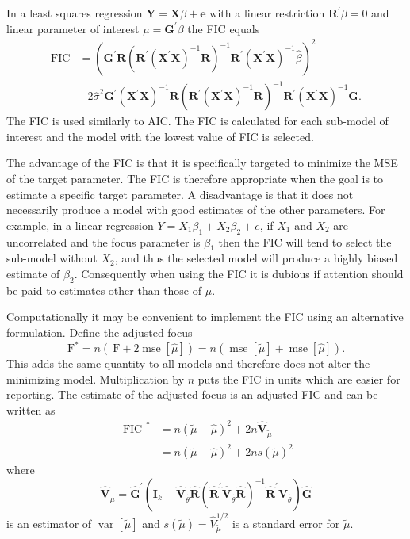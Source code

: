 \documentclass[10pt]{article}
\begin{document}
In a least squares regression $\boldsymbol{Y}=\boldsymbol{X} \beta+\boldsymbol{e}$ with a linear restriction $\boldsymbol{R}^{\prime} \beta=0$ and linear parameter of interest $\mu=\boldsymbol{G}^{\prime} \beta$ the FIC equals
$$
\begin{aligned}
\mathrm{FIC} &=\left(\boldsymbol{G}^{\prime} \boldsymbol{R}\left(\boldsymbol{R}^{\prime}\left(\boldsymbol{X}^{\prime} \boldsymbol{X}\right)^{-1} \boldsymbol{R}\right)^{-1} \boldsymbol{R}^{\prime}\left(\boldsymbol{X}^{\prime} \boldsymbol{X}\right)^{-1} \widehat{\beta}\right)^{2} \\
&-2 \widehat{\sigma}^{2} \boldsymbol{G}^{\prime}\left(\boldsymbol{X}^{\prime} \boldsymbol{X}\right)^{-1} \boldsymbol{R}\left(\boldsymbol{R}^{\prime}\left(\boldsymbol{X}^{\prime} \boldsymbol{X}\right)^{-1} \boldsymbol{R}\right)^{-1} \boldsymbol{R}^{\prime}\left(\boldsymbol{X}^{\prime} \boldsymbol{X}\right)^{-1} \boldsymbol{G} .
\end{aligned}
$$
The FIC is used similarly to AIC. The FIC is calculated for each sub-model of interest and the model with the lowest value of FIC is selected.

The advantage of the FIC is that it is specifically targeted to minimize the MSE of the target parameter. The FIC is therefore appropriate when the goal is to estimate a specific target parameter. A disadvantage is that it does not necessarily produce a model with good estimates of the other parameters. For example, in a linear regression $Y=X_{1} \beta_{1}+X_{2} \beta_{2}+e$, if $X_{1}$ and $X_{2}$ are uncorrelated and the focus parameter is $\beta_{1}$ then the FIC will tend to select the sub-model without $X_{2}$, and thus the selected model will produce a highly biased estimate of $\beta_{2}$. Consequently when using the FIC it is dubious if attention should be paid to estimates other than those of $\mu$.

Computationally it may be convenient to implement the FIC using an alternative formulation. Define the adjusted focus
$$
\mathrm{F}^{*}=n(\mathrm{~F}+2 \operatorname{mse}[\widehat{\mu}])=n(\operatorname{mse}[\widetilde{\mu}]+\operatorname{mse}[\widehat{\mu}]) .
$$
This adds the same quantity to all models and therefore does not alter the minimizing model. Multiplication by $n$ puts the FIC in units which are easier for reporting. The estimate of the adjusted focus is an adjusted FIC and can be written as
$$
\begin{aligned}
\text { FIC }^{*} &=n(\widetilde{\mu}-\widehat{\mu})^{2}+2 n \widehat{\boldsymbol{V}}_{\widetilde{\mu}} \\
&=n(\widetilde{\mu}-\widehat{\mu})^{2}+2 n s(\widetilde{\mu})^{2}
\end{aligned}
$$
where
$$
\widehat{\boldsymbol{V}}_{\widetilde{\mu}}=\widehat{\boldsymbol{G}}^{\prime}\left(\boldsymbol{I}_{k}-\widehat{\boldsymbol{V}}_{\widehat{\theta}} \widehat{\boldsymbol{R}}\left(\widehat{\boldsymbol{R}}^{\prime} \widehat{\boldsymbol{V}}_{\widehat{\theta}} \widehat{\boldsymbol{R}}\right)^{-1} \widehat{\boldsymbol{R}}^{\prime} \widehat{\boldsymbol{V}}_{\widehat{\theta}}\right) \widehat{\boldsymbol{G}}
$$
is an estimator of $\operatorname{var}[\widetilde{\mu}]$ and $s(\widetilde{\mu})=\widehat{V}_{\widetilde{\mu}}^{1 / 2}$ is a standard error for $\widetilde{\mu}$.
\end{document}
